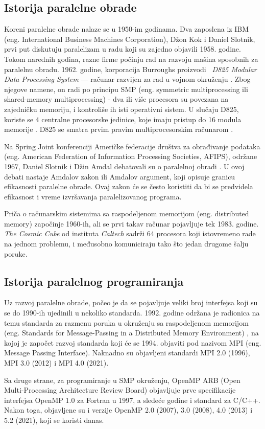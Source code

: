 \documentclass[a4paper]{article}
\begin{document}
	\subsection{Istorija paralelne obrade}
	Koreni paralelne obrade nalaze se u 1950-im godinama. Dva zaposlena iz IBM (eng. International Business Machines Corporation), Džon Kok i Daniel Slotnik, prvi put diskutuju paralelizam u radu koji su zajedno objavili 1958. godine\cite{historyofdevelopment}. Tokom narednih godina, razne firme počinju rad na razvoju mašina sposobnih za paralelnu obradu. 1962. godine, korporacija Burroughs proizvodi ~{\em D825 Modular Data Processing System} — računar razvijen za rad u vojnom okruženju \cite{d825}. Zbog njegove namene, on radi po principu SMP (eng. symmetric multiprocessing ili shared-memory multiprocessing) - dva ili više procesora su povezana na zajedničku memoriju, i kontroliše ih isti operativni sistem. U slučaju D825, koriste se 4 centralne procesorske jedinice, koje imaju pristup do 16 modula memorije \cite{d825}. D825 se smatra prvim pravim multiprocesorskim računarom \cite{multiprocessororganizationsurvey}.\par
	Na Spring Joint konferenciji Američke federacije društva za obrađivanje podataka (eng. American Federation of Information Processing Societies, AFIPS), održane 1967, Daniel Slotnik i Džin Amdal debatovali su o paralelnoj obradi \cite{springjoint}. U ovoj debati nastaje Amdalov zakon ili Amdalov argument, koji opisuje granicu efikasnosti paralelne obrade. Ovaj zakon će se često koristiti da bi se predvidela efikasnost i vreme izvršavanja paralelizovanog programa.\par
	Priča o računarskim sistemima sa raspodeljenom memorijom  (eng. distributed memory) započinje 1960-ih, ali se prvi takav računar pojavljuje tek 1983. godine\cite{hypercube}. \emph{The Cosmic Cube} od instituta \emph{Caltech} sadrži 64 procesora koji istovremeno rade na jednom problemu, i međusobno komuniciraju tako što jedan drugome šalju poruke\cite{thecosmiccube}.
	\subsection{Istorija paralelnog programiranja}
	Uz razvoj paralelne obrade, počeo je da se pojavljuje veliki broj interfejsa koji su se do 1990-ih ujedinili u nekoliko standarda. 1992. godine održana je radionica na temu standarda za razmenu poruka u okruženju sa raspodeljenom memorijom (eng. Standards for Message-Passing in a Distributed Memory Environment) \cite{standardsformessagepassing}, na kojoj je započet razvoj standarda koji će se 1994. objaviti pod nazivom MPI (eng. Message Passing Interface). Naknadno su objavljeni standardi MPI 2.0 (1996), MPI 3.0 (2012) i MPI 4.0 (2021)\cite{mpidocs}.\par
	Sa druge strane, za programiranje u SMP okruženju, OpenMP ARB (Open Multi-Processing Architecture Review Board) objavljuje prve specifikacije interfejsa OpenMP 1.0 za Fortran u 1997, a sledeće godine i standard za C/C++. Nakon toga, objavljene su i verzije OpenMP 2.0 (2007), 3.0 (2008), 4.0 (2013) i 5.2 (2021), koji se koristi danas\cite{opemp5}.
	
\end{document}
